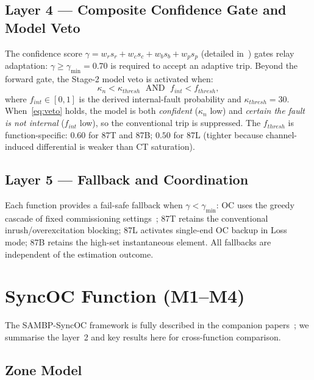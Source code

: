 \documentclass[journal,twoside,10pt]{IEEEtran}
\begin{document}
\subsection{Layer 4 — Composite Confidence Gate and Model Veto}
\label{sec:arch:l4}

The confidence score $\gamma = w_r s_r + w_c s_c + w_b s_b + w_p s_p$
(detailed in~\cite{EluvathingalPaperA}) gates relay adaptation:
$\gamma \geq \gamma_{\min} = 0.70$ is required to accept an adaptive trip.
Beyond the forward gate, the Stage-2 model veto is activated when:
\begin{equation}
  \kappa_n < \kappa_{thresh} \;\text{ AND }\; f_{int} < f_{thresh},
  \label{eq:veto}
\end{equation}
where $f_{int} \in [0,1]$ is the derived internal-fault probability and
$\kappa_{thresh} = 30$.
When~\eqref{eq:veto} holds, the model is both \emph{confident} ($\kappa_n$
low) and \emph{certain the fault is not internal} ($f_{int}$ low), so the
conventional trip is suppressed.
The $f_{thresh}$ is function-specific: $0.60$ for 87T and 87B; $0.50$
for 87L (tighter because channel-induced differential is weaker than
CT saturation).

\subsection{Layer 5 — Fallback and Coordination}
\label{sec:arch:l5}

Each function provides a fail-safe fallback when $\gamma < \gamma_{\min}$:
OC uses the greedy cascade of fixed commissioning settings~\cite{EluvathingalPaperB};
87T retains the conventional inrush/overexcitation blocking;
87L activates single-end OC backup in Loss mode;
87B retains the high-set instantaneous element.
All fallbacks are independent of the estimation outcome.

\section{SyncOC Function (M1--M4)}
\label{sec:syncoc}

The SAMBP-SyncOC framework is fully described in the companion
papers~\cite{EluvathingalPaperA,EluvathingalPaperB}; we summarise the
layer~2 and key results here for cross-function comparison.

\subsection{Zone Model}
\label{sec:syncoc:model}
\end{document}
